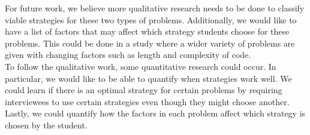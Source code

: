 \documentclass{article}
\begin{document}
For future work, we believe more qualitative research needs to be done to classify viable strategies for these two types of problems. 
Additionally, we would like to have a list of factors that may affect which strategy students choose for these problems. 
This could be done in a study where a wider variety of problems are given with changing factors such as length and complexity of code. 
\\

To follow the qualitative work, some quantitative research could occur. 
In particular, we would like to be able to quantify when strategies work well. 
We could learn if there is an optimal strategy for certain problems by requiring interviewees to use certain strategies even though they might choose another. 
Lastly, we could quantify how the factors in each problem affect which strategy is chosen by the student. 
\end{document}
